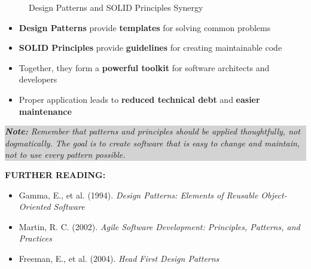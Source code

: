 \documentclass[12pt,a4paper]{article}
\newcommand{\important}[1]{\textbf{\textcolor{accent}{#1}}}
\newcommand{\note}[1]{\par\noindent\colorbox{lightgray}{\parbox{\linewidth}{\textit{\textbf{Note:} #1}}}\vspace{0.5em}}
\begin{document}
\begin{figure}[h]
    \centering
    \caption{Design Patterns and SOLID Principles Synergy}
    \label{fig:conclusion}
\end{figure}

\vspace{1em}

\begin{itemize}
    \item \important{Design Patterns} provide \textbf{templates} for solving common problems
    \item \important{SOLID Principles} provide \textbf{guidelines} for creating maintainable code
    \item Together, they form a \textbf{powerful toolkit} for software architects and developers
    \item Proper application leads to \textbf{reduced technical debt} and \textbf{easier maintenance}
\end{itemize}

\note{Remember that patterns and principles should be applied thoughtfully, not dogmatically. The goal is to create software that is easy to change and maintain, not to use every pattern possible.}

\vspace{1em}

\noindent\textbf{\color{primary}FURTHER READING:}
\begin{itemize}
    \item Gamma, E., et al. (1994). \textit{Design Patterns: Elements of Reusable Object-Oriented Software}
    \item Martin, R. C. (2002). \textit{Agile Software Development: Principles, Patterns, and Practices}
    \item Freeman, E., et al. (2004). \textit{Head First Design Patterns}
\end{itemize}
\end{document}
